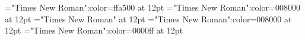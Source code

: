 \documentclass[a4paper]{article}
\begin{document}
\pagestyle{plain}
\sloppy
\setlength{\parfillskip}{0pt plus 1fil}
\font\xitemen="Times New Roman":color=ffa500 at 12pt
\font\xitemenxitem="Times New Roman":color=008000 at 12pt
\font\main="Times New Roman" at 12pt
\font\xitemenmain="Times New Roman":color=008000 at 12pt
\font\xitemxitemmain="Times New Roman":color=0000ff at 12pt

\mbox{} 
\newpage 
\newpage 
\setcounter{page}{1} 
\pagestyle{fancy} 








\end{document}
